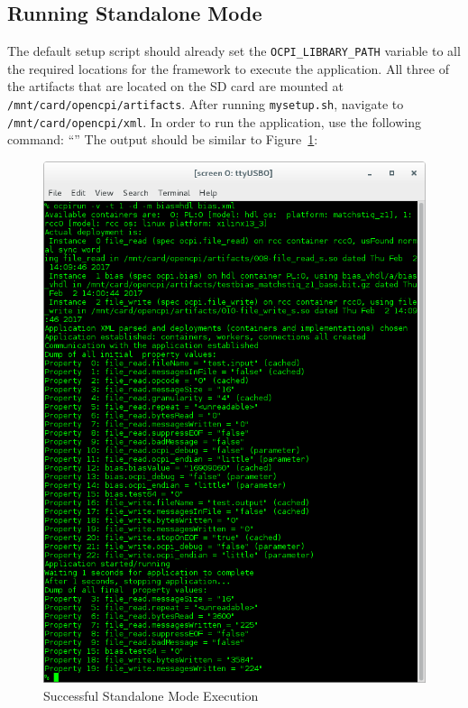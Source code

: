 \subsection{Running Standalone Mode}
\begin{flushleft}
The default setup script should already set the \texttt{OCPI\_LIBRARY\_PATH} variable to all the required locations for the framework to execute the application.  All three of the artifacts that are located on the SD card are mounted at \texttt{/mnt/card/opencpi/artifacts}.  After running \texttt{mysetup.sh}, navigate to \texttt{/mnt/card/opencpi/xml}.  In order to run the application, use the following command: ``'' The output should be similar to Figure~\ref{fig:standBias}:
\end{flushleft}
\begin{minipage}{\linewidth}
\begin{figure}[H]
	\centerline{\includegraphics[scale=0.5]{Matchstiq_Z1_stand_bias}}
	\caption{Successful Standalone Mode Execution}
 \label{fig:standBias}
\end{figure}
\end{minipage}
